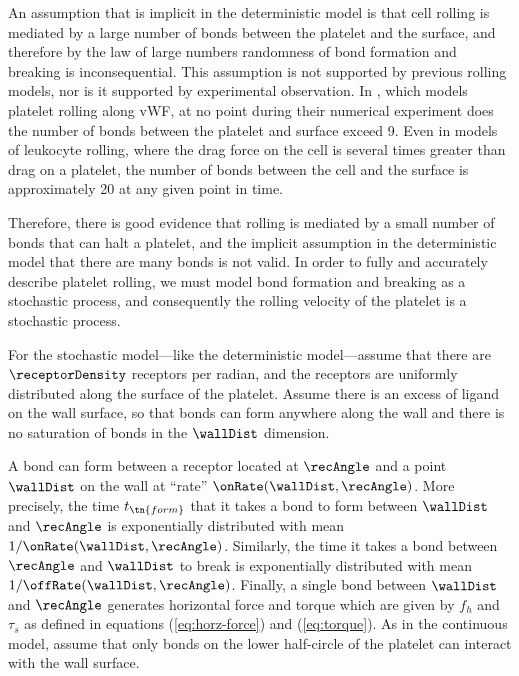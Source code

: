 An assumption that is implicit in the deterministic model is that cell
rolling is mediated by a large number of bonds between the platelet
and the surface, and therefore by the law of large numbers randomness
of bond formation and breaking is inconsequential. This assumption is
not supported by previous rolling models, nor is it supported by
experimental observation. In \cite{Wang2013}, which models platelet
rolling along vWF, at no point during their numerical experiment does
the number of bonds between the platelet and surface exceed 9. Even in
models of leukocyte rolling, where the drag force on the cell is
several times greater than drag on a platelet, the number of bonds
between the cell and the surface is approximately 20 at any given
point in time.

Therefore, there is good evidence that rolling is mediated by a small
number of bonds that can halt a platelet, and the implicit assumption
in the deterministic model that there are many bonds is not valid. In
order to fully and accurately describe platelet rolling, we must model
bond formation and breaking as a stochastic process, and consequently
the rolling velocity of the platelet is a stochastic process.

For the stochastic model---like the deterministic model---assume that
there are $\receptorDensity$ receptors per radian, and the receptors
are uniformly distributed along the surface of the platelet. Assume
there is an excess of ligand on the wall surface, so that bonds can
form anywhere along the wall and there is no saturation of bonds in
the $\wallDist$ dimension.

A bond can form between a receptor located at $\recAngle$ and a point
$\wallDist$ on the wall at ``rate'' $\onRate(\wallDist,
\recAngle)$. More precisely, the time $t_\tn{form}$ that it takes a
bond to form between $\wallDist$ and $\recAngle$ is exponentially
distributed with mean $1/\onRate(\wallDist, \recAngle)$. Similarly,
the time it takes a bond between $\recAngle$ and $\wallDist$ to break
is exponentially distributed with mean
$1/\offRate(\wallDist, \recAngle)$. Finally, a single bond between
$\wallDist$ and $\recAngle$ generates horizontal force and torque
which are given by $f_h$ and $\tau_s$ as defined in equations
(\ref{eq:horz-force}) and (\ref{eq:torque}). As in the continuous
model, assume that only bonds on the lower half-circle of the platelet
can interact with the wall surface.

